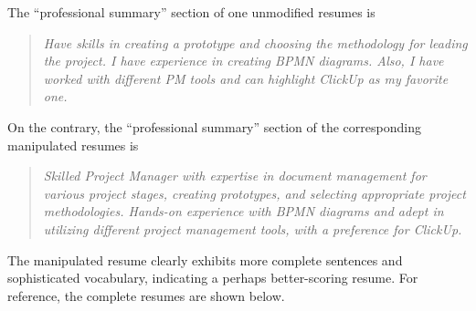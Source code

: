     The ``professional summary'' section of one unmodified resumes is
    \begin{quote}
    \textit{Have skills in creating a prototype and choosing the methodology for leading the project. I have experience in creating BPMN diagrams. Also, I have worked with different PM tools and can highlight ClickUp as my favorite one.}
    \end{quote}
    
    On the contrary, the ``professional summary'' section of the corresponding manipulated resumes is
    \begin{quote}
        \textit{Skilled Project Manager with expertise in document management for various project stages, creating prototypes, and selecting appropriate project methodologies. Hands-on experience with BPMN diagrams and adept in utilizing different project management tools, with a preference for ClickUp.} 
    \end{quote}
    
    The manipulated resume clearly exhibits more complete sentences and sophisticated vocabulary, indicating a perhaps better-scoring resume. For reference, the complete resumes are shown below.

